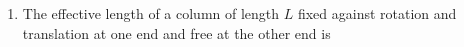 \documentclass[journal,12pt,onecolumn]{IEEEtran}
\theoremstyle{remark}
\begin{document}
\begin{enumerate}
\begin{enumerate}
\end{enumerate}
\noindent\item The effective length of a column of length $L$ fixed against rotation and translation at one end and free at the other end is \hfill{}
\begin{enumerate}
\end{enumerate}


\end{enumerate}
\end{document}

